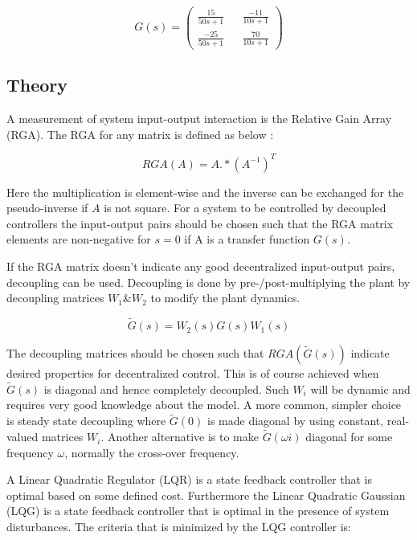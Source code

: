 \documentclass[a4paper, titlepage]{article}
\begin{document}
\begin{equation}
G(s) = 
\begin{pmatrix}
\frac{15}{50s + 1} && \frac{-11}{10s + 1} \\[6pt]
\frac{-25}{50s + 1} && \frac{70}{10s + 1}
\end{pmatrix}
\label{equ:origianlG}
\end{equation}

\subsection{Theory}

A measurement of system input-output interaction is the Relative Gain Array (RGA).
The RGA for any matrix is defined as below \citep[~p.219]{glad00}:

\begin{equation}
RGA(A) = A.*(A^{-1})^T
\end{equation}

Here the multiplication is element-wise and the inverse can be exchanged for the pseudo-inverse if $A$ is not square.
For a system to be controlled by decoupled controllers the input-output pairs should be chosen such that the RGA matrix elements are non-negative for $s=0$ if A is a transfer function $G(s)$.

If the RGA matrix doesn't indicate any good decentralized input-output pairs, decoupling can be used.
Decoupling is done by pre-/post-multiplying the plant by decoupling matrices $W_1 \& W_2$ to modify the plant dynamics.

\begin{equation}
\tilde{G}(s) = W_2(s)G(s)W_1(s)
\end{equation}

The decoupling matrices should be chosen such that $RGA(\tilde{G}(s))$ indicate desired properties for decentralized control.
This is of course achieved when $\tilde{G}(s)$ is diagonal and hence completely decoupled.
Such $W_i$ will be dynamic and requires very good knowledge about the model.
A more common, simpler choice is steady state decoupling where $\tilde{G}(0)$ is made diagonal by using constant, real-valued matrices $W_i$.
Another alternative is to make $\tilde{G}(\omega i)$ diagonal for some frequency $\omega$, normally the cross-over frequency. \citep[~p.226]{glad00}








A Linear Quadratic Regulator (LQR) is a state feedback controller that is optimal based on some defined cost.
Furthermore the Linear Quadratic Gaussian (LQG) is a state feedback controller that is optimal in the presence of system disturbances.
The criteria that is minimized by the LQG controller is:
\end{document}
